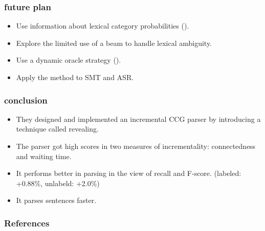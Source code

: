 \documentclass[10pt]{beamer}
\begin{document}
\begin{frame}
    \frametitle{future plan}
    \begin{itemize}
        \item Use information about lexical category probabilities (\cite{auli2011}).

        \item Explore the limited use of a beam to handle lexical ambiguity.
        \item Use a dynamic oracle strategy (\cite{xu2014}).
        \item Apply the method to SMT and ASR.
    \end{itemize}
\end{frame}

\begin{frame}
    \frametitle{conclusion}
    \begin{itemize}
        \item They designed and implemented an incremental CCG parser by introducing a technique called revealing.
        \item The parser got high scores in two measures of incrementality: connectedness and waiting time.
        \item It performs better in parsing in the view of recall and F-score. (labeled: +0.88\%, unlabeld: +2.0\%)
        \item It parses sentences faster.
    \end{itemize}
\end{frame}

\begin{frame}
  \frametitle{References}

  
  

\end{frame}
\end{document}
